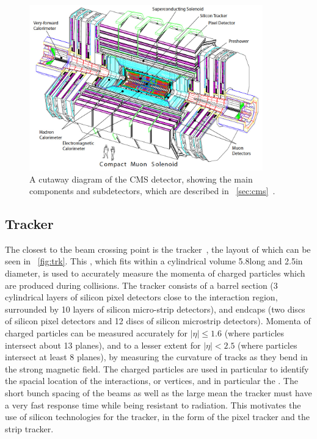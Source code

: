 \begin{figure}[h]
\centering
\includegraphics[width=0.9\textwidth]{detectorFigures/cms-perspective.png}
\caption{A cutaway diagram of the CMS detector, showing the main components and subdetectors, which are described in \Sec~\ref{sec:cms}~\cite{CMSTDR}.}
\label{fig:cms-exploded}
\end{figure}

\subsection{Tracker}
\label{sec:cms:tracker}

The closest \subdetector to the beam crossing point is the tracker~\cite{CMSTrackerTDR}, the layout of which can be seen in \Fig~\ref{fig:trk}. This \subdetector, which fits within a cylindrical volume 5.8\m long and 2.5\m in diameter, is used to accurately measure the momenta of charged particles which are produced during \pp collisions. The tracker consists of a barrel section (3 cylindrical layers of silicon pixel detectors close to the interaction region, surrounded by 10 layers of silicon micro-strip detectors), and endcaps (two discs of silicon pixel detectors and 12 discs of silicon microstrip detectors). Momenta of charged particles can be measured accurately for $|\eta|\leq 1.6$ (where particles intersect about 13 planes), and to a lesser extent for $|\eta| <2.5$ (where particles intersect at least 8 planes), by measuring the curvature of tracks as they bend in the strong magnetic field. 
The charged particles are used in particular to identify the spacial location of the interactions, or vertices, and in particular the \PV. The short bunch spacing of the \LHC beams as well as the large \pp \crosssection mean the tracker must have a very fast response time while being resistant to radiation. This motivates the use of silicon technologies for the \CMS tracker, in the form of the pixel tracker and the strip tracker.

